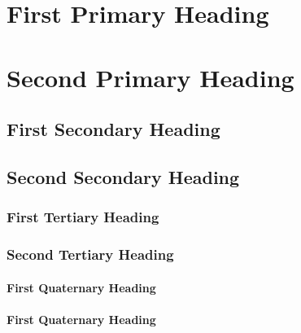 \documentclass[12pt]{article}
\begin{document}
{}
{\linenumbers}

%
\section{First Primary Heading}

\section{Second Primary Heading}

\subsection{First Secondary Heading}

\subsection{Second Secondary Heading}

\subsubsection{First Tertiary Heading}

\subsubsection{Second Tertiary Heading}

\paragraph{First Quaternary Heading}

\paragraph{First Quaternary Heading}

\end{document}
